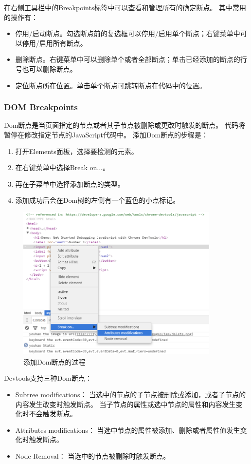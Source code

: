在右侧工具栏中的Breakpoints标签中可以查看和管理所有的确定断点。
其中常用的操作有：
\begin{itemize}
\item 停用/启动断点。勾选断点前的复选框可以停用/启用单个断点；右键菜单中可以停用/启用所有断点。
\item 删除断点。右键菜单中可以删除单个或者全部断点；单击已经添加的断点的行号也可以删除断点。
\item 定位断点所在位置。单击单个断点可跳转断点在代码中的位置。
\end{itemize}

\subsubsection{DOM Breakpoints}
Dom断点是当页面指定的节点或者其子节点被删除或更改时触发的断点。
代码将暂停在修改指定节点的JavaScript代码中。
添加Dom断点的步骤是：
\begin{enumerate}
\item 打开Elements面板，选择要检测的元素。
\item 在右键菜单中选择Break on...。
\item 再在子菜单中选择添加断点的类型。
\item 添加成功后会在Dom树的左侧有一个蓝色的小点标记。
\end{enumerate}

\begin{figure}[H] 
\centering 
\includegraphics[width=0.9\textwidth]{image/devtools_study/add_dom_breakpoint.png} 
\caption{添加Dom断点的过程} \label{fig:sources_panel} 
\end{figure}

Devtools支持三种Dom断点：
\begin{itemize}
\item Subtree modifications： 当选中的节点的子节点被删除或添加，或者子节点的内容发生改变时触发断点。
当子节点的属性或选中节点的属性和内容发生变化时不会触发断点。
\item Attributes modifications： 当选中节点的属性被添加、删除或者属性值发生变化时触发断点。
\item Node Removal： 当选中的节点被删除时触发断点。
\end{itemize}

